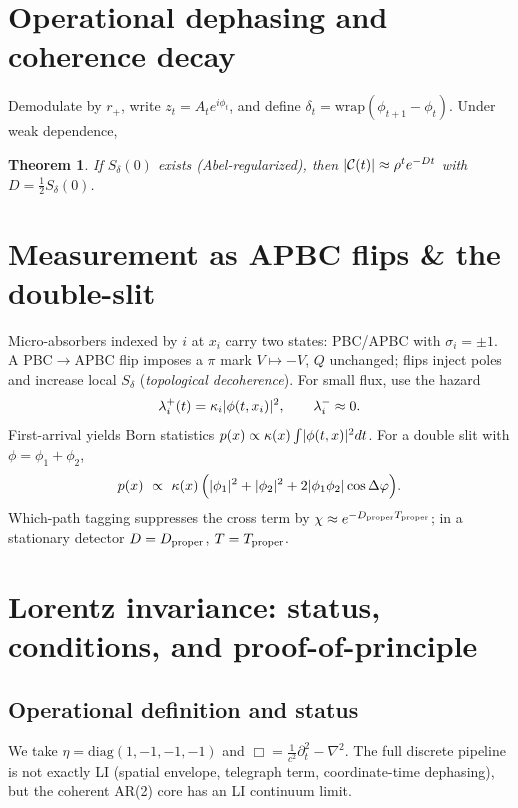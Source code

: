 \documentclass[12pt]{article}
\newtheorem{theorem}{Theorem}[section]
\theoremstyle{definition}
\DeclarePairedDelimiter{\abs}{\lvert}{\rvert}
\begin{document}
\section{Operational dephasing and coherence decay}
Demodulate by $r_+$, write $z_t=A_t e^{i\phi_t}$, and define $\delta_t=\mathrm{wrap}(\phi_{t+1}-\phi_t)$. Under weak dependence,
\begin{theorem}
If $S_\delta(0)$ exists (Abel-regularized), then $\abs{\mathcal C(t)}\approx \rho^t e^{-Dt}$ with $D=\tfrac12 S_\delta(0)$.
\end{theorem}

\section{Measurement as APBC flips \& the double-slit}
Micro-absorbers indexed by $i$ at $x_i$ carry two states: PBC/APBC with $\sigma_i=\pm1$. A PBC$\to$APBC flip imposes a $\pi$ mark $V\mapsto -V$, $Q$ unchanged; flips inject poles and increase local $S_\delta$ (\emph{topological decoherence}). For small flux, use the hazard
\begin{equation}
\lambda_i^+(t)=\kappa_i\abs{\phi(t,x_i)}^2,\qquad \lambda_i^-\approx0.
\end{equation}
First-arrival yields Born statistics $p(x)\propto \kappa(x)\int\abs{\phi(t,x)}^2 dt$. For a double slit with $\phi=\phi_1+\phi_2$,
\begin{equation}
p(x)\ \propto\ \kappa(x)\,\Big(\abs{\phi_1}^2+\abs{\phi_2}^2+2\abs{\phi_1\phi_2}\cos\Delta\varphi\Big).
\end{equation}
Which-path tagging suppresses the cross term by $\chi\approx e^{-D_{\rm proper}T_{\rm proper}}$; in a stationary detector $D=D_{\rm proper}$, $T=T_{\rm proper}$.

\section{Lorentz invariance: status, conditions, and proof-of-principle}\label{sec:lorentz}
\subsection{Operational definition and status}
We take $\eta=\mathrm{diag}(1,-1,-1,-1)$ and $\Box=\frac{1}{c^2}\partial_t^2-\nabla^2$. The full discrete pipeline is not exactly LI (spatial envelope, telegraph term, coordinate-time dephasing), but the coherent AR(2) core has an LI continuum limit.
\end{document}
